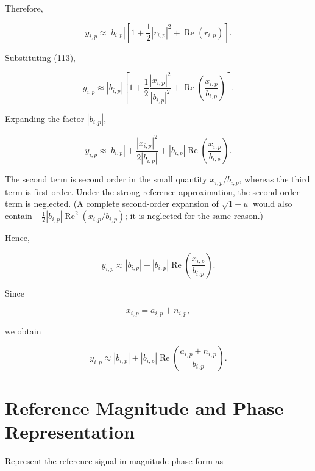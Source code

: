 \documentclass[12pt,a4paper]{article}
\begin{document}
Therefore,

\begin{equation}
y_{i,p}
\approx
|b_{i,p}|
\left[
1+
\frac{1}{2}|r_{i,p}|^2
+
\operatorname{Re}(r_{i,p})
\right].
\tag{119}
\end{equation}

Substituting (113),

\begin{equation}
y_{i,p}
\approx
|b_{i,p}|
\left[
1+
\frac{1}{2}
\frac{|x_{i,p}|^2}{|b_{i,p}|^2}
+
\operatorname{Re}
\left(
\frac{x_{i,p}}{b_{i,p}}
\right)
\right].
\tag{120}
\end{equation}

Expanding the factor $|b_{i,p}|$,

\begin{equation}
y_{i,p}
\approx
|b_{i,p}|
+
\frac{|x_{i,p}|^2}{2|b_{i,p}|}
+
|b_{i,p}|
\operatorname{Re}
\left(
\frac{x_{i,p}}{b_{i,p}}
\right).
\tag{121}
\end{equation}

The second term is second order in the small quantity $x_{i,p}/b_{i,p}$, whereas the third term is first order. Under the strong-reference approximation, the second-order term is neglected.
(A complete second-order expansion of \(\sqrt{1+u}\) would also contain
\(-\tfrac12|b_{i,p}|\operatorname{Re}^2(x_{i,p}/b_{i,p})\); it is neglected for the same reason.)

Hence,

\begin{equation}
\boxed{
y_{i,p}
\approx
|b_{i,p}|
+
|b_{i,p}|
\operatorname{Re}
\left(
\frac{x_{i,p}}{b_{i,p}}
\right)
}.
\tag{122}
\end{equation}

Since

\begin{equation}
x_{i,p}
=
a_{i,p}+n_{i,p},
\tag{123}
\end{equation}

we obtain

\begin{equation}
y_{i,p}
\approx
|b_{i,p}|
+
|b_{i,p}|
\operatorname{Re}
\left(
\frac{a_{i,p}+n_{i,p}}{b_{i,p}}
\right).
\tag{124}
\end{equation}

\section{Reference Magnitude and Phase Representation}

Represent the reference signal in magnitude-phase form as
\end{document}
